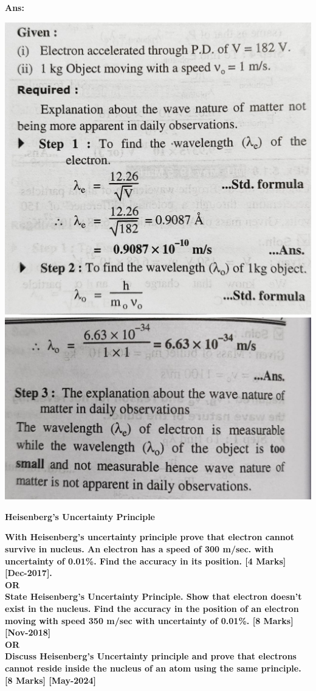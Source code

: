 \documentclass{exam}
\begin{document}
\begin{questions}
\textbf{Ans:}
\begin{center}
\includegraphics[scale=0.15]{Q5-1.jpeg}
\includegraphics[scale=0.18]{Q5-2.jpeg}
\end{center}


\newpage

\begin{center} \textbf{ \Large Heisenberg's Uncertainty Principle} \end{center}

\question \textbf{ With Heisenberg's uncertainty principle prove that electron cannot survive in nucleus. An electron has a speed of 300 m/sec. with uncertainty of 0.01\%. Find the accuracy in its position. \hfil [4 Marks] [Dec-2017].
\\ OR \\
State Heisenberg's Uncertainty Principle. Show that electron doesn't exist in the nucleus. Find the accuracy in the position of an electron moving with speed 350 m/sec with uncertainty of 0.01\%. \hfil [8 Marks] [Nov-2018]  
\\ OR \\
Discuss Heisenberg's Uncertainty principle and prove that electrons cannot reside inside the nucleus of an atom using the same principle. \hfil [8 Marks] [May-2024] 
} 


\end{questions}
\end{document}
